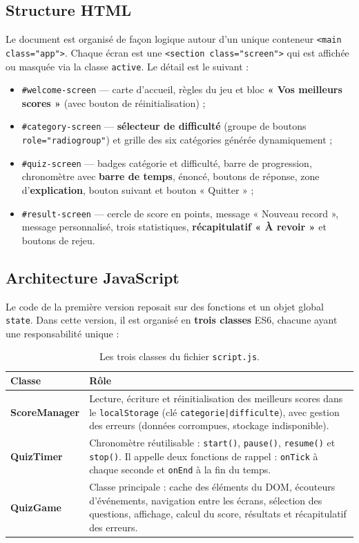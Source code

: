 \documentclass[11pt,a4paper]{article}
\begin{document}
\subsection{Structure HTML}
Le document est organisé de façon logique autour d'un unique conteneur
\texttt{<main class="app">}. Chaque écran est une \texttt{<section class="screen">}
qui est affichée ou masquée via la classe \texttt{active}. Le détail est le suivant :
\begin{itemize}
  \item \texttt{\#welcome-screen} --- carte d'accueil, règles du jeu et bloc
        \textbf{« Vos meilleurs scores »} (avec bouton de réinitialisation) ;
  \item \texttt{\#category-screen} --- \textbf{sélecteur de difficulté} (groupe de boutons
        \texttt{role="radiogroup"}) et grille des six catégories générée dynamiquement ;
  \item \texttt{\#quiz-screen} --- badges catégorie et difficulté, barre de progression,
        chronomètre avec \textbf{barre de temps}, énoncé, boutons de réponse, zone
        d'\textbf{explication}, bouton suivant et bouton « Quitter » ;
  \item \texttt{\#result-screen} --- cercle de score en points, message « Nouveau record »,
        message personnalisé, trois statistiques, \textbf{récapitulatif « À revoir »} et
        boutons de rejeu.
\end{itemize}

\subsection{Architecture JavaScript}
Le code de la première version reposait sur des fonctions et un objet global
\texttt{state}. Dans cette version, il est organisé en \textbf{trois classes} ES6, chacune
ayant une responsabilité unique :

\begin{table}[H]
\centering
\renewcommand{\arraystretch}{1.3}
\begin{tabularx}{\linewidth}{@{}>{\bfseries}l X@{}}
\toprule
Classe & Rôle \\
\midrule
ScoreManager & Lecture, écriture et réinitialisation des meilleurs scores dans le
\texttt{localStorage} (clé \texttt{categorie|difficulte}), avec gestion des erreurs
(données corrompues, stockage indisponible). \\
QuizTimer & Chronomètre réutilisable : \texttt{start()}, \texttt{pause()},
\texttt{resume()} et \texttt{stop()}. Il appelle deux fonctions de rappel :
\texttt{onTick} à chaque seconde et \texttt{onEnd} à la fin du temps. \\
QuizGame & Classe principale : cache des éléments du DOM, écouteurs d'événements,
navigation entre les écrans, sélection des questions, affichage, calcul du score,
résultats et récapitulatif des erreurs. \\
\bottomrule
\end{tabularx}
\caption{Les trois classes du fichier \texttt{script.js}.}
\end{table}
\end{document}
